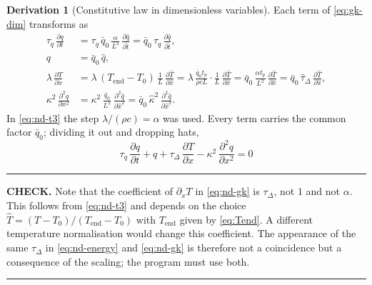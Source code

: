 \documentclass[11pt,a4paper]{article}
\theoremstyle{definition}
\newtheorem{derivationx}{Derivation}[section]
\newenvironment{checkbox}%
  {\par\medskip\noindent\begin{minipage}{\linewidth}%
   \rule{\linewidth}{0.4pt}\par\noindent\textbf{CHECK.}\enspace}%
  {\par\rule{\linewidth}{0.4pt}\end{minipage}\par\medskip}
\newcommand{\tq}{\tau_{q}}
\newcommand{\kk}{\kappa^{2}}
\begin{document}
\begin{derivationx}[Constitutive law in dimensionless variables]
\label{der:nd-gk}
Each term of \eqref{eq:gk-dim} transforms as
\begin{align}
  \tq\,\frac{\partial q}{\partial t}
   &= \tq\,\bar q_{0}\,\frac{\alpha}{L^{2}}\,
      \frac{\partial\hat q}{\partial\hat t}
    = \bar q_{0}\,\hat\tau_{q}\,\frac{\partial\hat q}{\partial\hat t} ,
  \label{eq:nd-t1}\\
  q &= \bar q_{0}\,\hat q ,
  \label{eq:nd-t2}\\
  \lambda\,\frac{\partial T}{\partial x}
   &= \lambda\,(T_{\mathrm{end}}-T_{0})\,\frac{1}{L}\,
      \frac{\partial\hat T}{\partial\hat x}
    = \lambda\,\frac{\bar q_{0}t_{p}}{\rho c L}\cdot\frac{1}{L}\,
      \frac{\partial\hat T}{\partial\hat x}
    = \bar q_{0}\,\frac{\alpha t_{p}}{L^{2}}\,
      \frac{\partial\hat T}{\partial\hat x}
    = \bar q_{0}\,\hat\tau_{\Delta}\,
      \frac{\partial\hat T}{\partial\hat x} ,
  \label{eq:nd-t3}\\
  \kk\,\frac{\partial^{2}q}{\partial x^{2}}
   &= \kk\,\frac{\bar q_{0}}{L^{2}}\,
      \frac{\partial^{2}\hat q}{\partial\hat x^{2}}
    = \bar q_{0}\,\hat\kappa^{2}\,
      \frac{\partial^{2}\hat q}{\partial\hat x^{2}} .
  \label{eq:nd-t4}
\end{align}
In \eqref{eq:nd-t3} the step $\lambda/(\rho c)=\alpha$ was used. Every term
carries the common factor $\bar q_{0}$; dividing it out and dropping hats,
\begin{equation}
  \boxed{\ \tq\,\frac{\partial q}{\partial t} + q
        + \tau_{\Delta}\,\frac{\partial T}{\partial x}
        - \kk\,\frac{\partial^{2} q}{\partial x^{2}} = 0\ }
  \label{eq:nd-gk}
\end{equation}
\end{derivationx}

\begin{checkbox}
Note that the coefficient of $\partial_{x}T$ in \eqref{eq:nd-gk} is
$\tau_{\Delta}$, not $1$ and not $\alpha$. This follows from
\eqref{eq:nd-t3} and depends on the choice $\hat T=(T-T_{0})/
(T_{\mathrm{end}}-T_{0})$ with $T_{\mathrm{end}}$ given by \eqref{eq:Tend}. A
different temperature normalisation would change this coefficient. The
appearance of the same $\tau_{\Delta}$ in \eqref{eq:nd-energy} and
\eqref{eq:nd-gk} is therefore not a coincidence but a consequence of the
scaling; the program must use both.
\end{checkbox}
\end{document}
